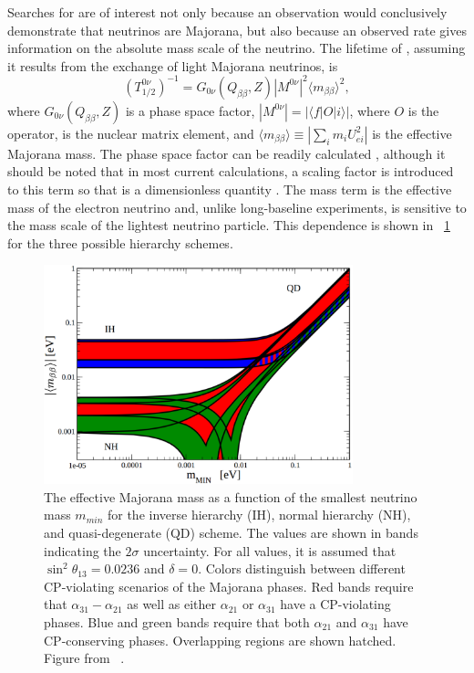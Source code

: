 Searches for \zvbb are of interest not only because an observation would conclusively demonstrate that neutrinos are Majorana, but also because an observed rate gives information on the absolute mass scale of the neutrino.  The lifetime of \zvbb, assuming it results from the exchange of light Majorana neutrinos, is 
\begin{equation}
(T^{0\nu}_{1/2})^{-1} = G_{0\nu}(Q_{\beta\beta},Z)|M^{0\nu}|^2 {\langle}m_{\beta\beta}{\rangle}^2,
\end{equation}
where $G_{0\nu}(Q_{\beta\beta},Z)$ is a phase space factor, $|M^{0\nu}| = |{\langle}f|O|i{\rangle}|$, where $O$ is the \zvbb operator, is the nuclear matrix element, and $\displaystyle {\langle}m_{\beta\beta}{\rangle} \equiv |\sum_{i}m_i U_{ei}^2|$ is the effective Majorana mass.  The phase space factor can be readily calculated \citep{hadron_zvbb_Suhonen}, although it should be noted that in most current calculations, a scaling factor is introduced to this term so that \NME is a dimensionless quantity \citep{scalingFactorNME}.  The mass term is the effective mass of the electron neutrino and, unlike long-baseline experiments, is sensitive to the mass scale of the lightest neutrino particle.  This dependence is shown in {\fig}~\ref{fig:effectiveMajoranaMass} for the three possible hierarchy schemes.  
\begin{figure}[htp]
\centering
\includegraphics[width=0.8\textwidth]{figures/effectiveMajoranaMass.eps}
\caption[The effective Majorana mass as a function of the smallest neutrino mass.]{The effective Majorana mass as a function of the smallest neutrino mass $m_{min}$ for the inverse hierarchy (IH), normal hierarchy (NH), and quasi-degenerate (QD) scheme.  The values are shown in bands indicating the $2\sigma$ uncertainty.  For all values, it is assumed that $\sin^2{\theta}_{13} = 0.0236$ and $\delta = 0$.  Colors distinguish between different CP-violating scenarios of the Majorana phases.  Red bands require that $\alpha_{31}-\alpha_{21}$ as well as either $\alpha_{21}$ or $\alpha_{31}$ have a CP-violating phases.  Blue and green bands require that both $\alpha_{21}$ and $\alpha_{31}$ have CP-conserving phases.  Overlapping regions are shown hatched.  Figure from {}~\citep{PDG}.}
\label{fig:effectiveMajoranaMass}
\end{figure}

